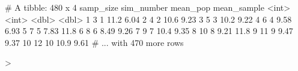 \documentclass{article}
\begin{document}
\begin{Schunk}
\begin{Soutput}
# A tibble: 480 x 4
   samp_size sim_number mean_pop mean_sample
       <int>      <int>    <dbl>       <dbl>
 1         3          1    11.2         6.04
 2         4          2    10.6         9.23
 3         5          3    10.2         9.22
 4         6          4     9.58        6.93
 5         7          5     7.83       11.8 
 6         8          6     8.49        9.26
 7         9          7    10.4         9.35
 8        10          8     9.21       11.8 
 9        11          9     9.47        9.37
10        12         10    10.9         9.61
# ... with 470 more rows
\end{Soutput}
\begin{Sinput}
> 
\end{Sinput}
\end{Schunk}
\end{document}
